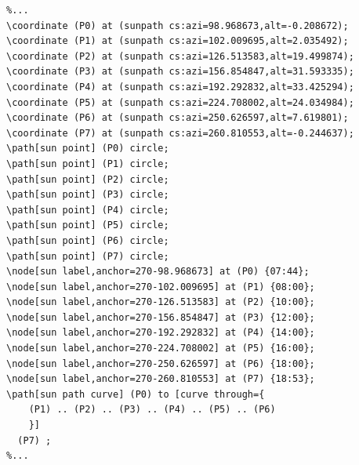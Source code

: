\begin{verbatim}
%...
\coordinate (P0) at (sunpath cs:azi=98.968673,alt=-0.208672);
\coordinate (P1) at (sunpath cs:azi=102.009695,alt=2.035492);
\coordinate (P2) at (sunpath cs:azi=126.513583,alt=19.499874);
\coordinate (P3) at (sunpath cs:azi=156.854847,alt=31.593335);
\coordinate (P4) at (sunpath cs:azi=192.292832,alt=33.425294);
\coordinate (P5) at (sunpath cs:azi=224.708002,alt=24.034984);
\coordinate (P6) at (sunpath cs:azi=250.626597,alt=7.619801);
\coordinate (P7) at (sunpath cs:azi=260.810553,alt=-0.244637);
\path[sun point] (P0) circle;
\path[sun point] (P1) circle;
\path[sun point] (P2) circle;
\path[sun point] (P3) circle;
\path[sun point] (P4) circle;
\path[sun point] (P5) circle;
\path[sun point] (P6) circle;
\path[sun point] (P7) circle;
\node[sun label,anchor=270-98.968673] at (P0) {07:44};
\node[sun label,anchor=270-102.009695] at (P1) {08:00};
\node[sun label,anchor=270-126.513583] at (P2) {10:00};
\node[sun label,anchor=270-156.854847] at (P3) {12:00};
\node[sun label,anchor=270-192.292832] at (P4) {14:00};
\node[sun label,anchor=270-224.708002] at (P5) {16:00};
\node[sun label,anchor=270-250.626597] at (P6) {18:00};
\node[sun label,anchor=270-260.810553] at (P7) {18:53};
\path[sun path curve] (P0) to [curve through={ 
    (P1) .. (P2) .. (P3) .. (P4) .. (P5) .. (P6) 
    }] 
  (P7) ;
%...
\end{verbatim}


